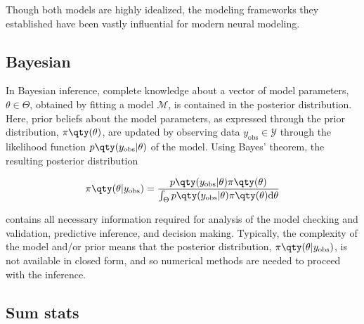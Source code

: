 Though both models are highly idealized, the modeling frameworks they established have been vastly influential for modern neural modeling.

\subsection{Bayesian}

In Bayesian inference, complete knowledge about a vector of model parameters, $\theta \in \Theta$, obtained by fitting a model $\mathcal{M}$, is contained in the posterior distribution. Here, prior beliefs about the model parameters, as expressed through the prior distribution, $\pi \qty(\theta)$, are updated by observing data $y_\mathrm{obs} \in \mathcal{Y}$ through the likelihood function $p  \qty(y_\mathrm{obs} | \theta)$ of the model. Using Bayes' theorem, the resulting posterior distribution

\begin{equation}
    \pi \qty(\theta | y_\mathrm{obs}) = \frac{p  \qty(y_\mathrm{obs} | \theta) \pi \qty(\theta)}{\int_\Theta p  \qty(y_\mathrm{obs} | \theta) \pi \qty(\theta) \mathrm{d} \theta}
\end{equation}

contains all necessary information required for analysis of the model checking and validation, predictive inference, and decision making. Typically, the complexity of the model and/or prior means that the posterior distribution, $\pi \qty(\theta | y_\mathrm{obs})$, is not available in closed form, and so numerical methods are needed to proceed with the inference. 

\subsection{Sum stats}

